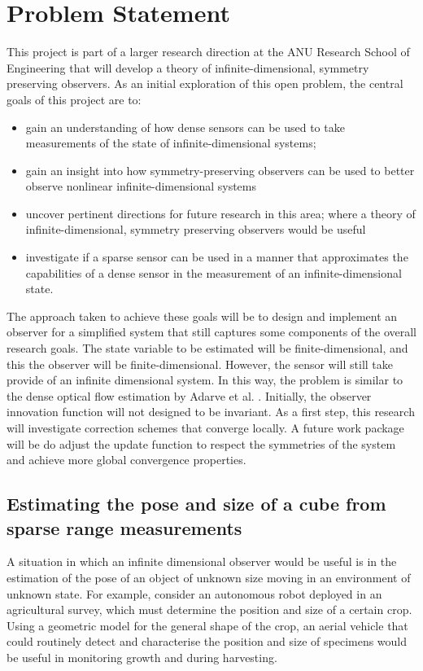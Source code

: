 \chapter{Problem Statement} \label{chap:problem}
This project is part of a larger research direction at the ANU Research School of Engineering that will develop a theory of infinite-dimensional, symmetry preserving observers.
As an initial exploration of this open problem, the central goals of this project are to:
\begin{itemize}
\item gain an understanding of how dense sensors can be used to take measurements of the state of infinite-dimensional systems;
\item gain an insight into how symmetry-preserving observers can be used to better observe nonlinear infinite-dimensional systems
\item uncover pertinent directions for future research in this area; where a theory of infinite-dimensional, symmetry preserving observers would be useful
\item investigate if a sparse sensor can be used in a manner that approximates the capabilities of a dense sensor in the measurement of an infinite-dimensional state.
\end{itemize}

The approach taken to achieve these goals will be to design and implement an observer for a simplified system that still captures some components of the overall research goals.
The state variable to  be estimated will be finite-dimensional, and this the observer will be finite-dimensional. However, the sensor will still take provide of an infinite dimensional system. In this way, the problem is similar to the dense optical flow estimation by Adarve et al. \cite{adarvefiltering}.
Initially, the observer innovation function will not designed to be invariant. As a first step, this research will investigate correction schemes that converge locally. A future work package will be do adjust the update function to respect the symmetries of the system and achieve more global convergence properties. 

\section{Estimating the pose and size of a cube from sparse range measurements}

A situation in which an infinite dimensional observer would be useful is in the estimation of the pose of an object of unknown size moving in an environment of unknown state.
For example, consider an autonomous robot deployed in an agricultural survey, which must determine the position and size of a certain crop. Using a geometric model for the general shape of the crop, an aerial vehicle that could routinely detect and characterise the position and size of specimens would be useful in monitoring growth and during harvesting.


